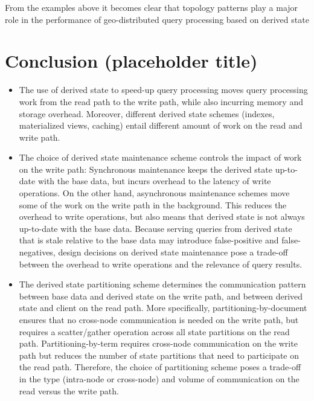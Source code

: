 \bigskip

From the examples above it becomes clear that topology patterns play a major role in the performance of geo-distributed
query processing based on derived state

\section{Conclusion (placeholder title)}


\begin{itemize}
  \item The use of derived state to speed-up query processing moves query processing work from the read path to the write
  path, while also incurring memory and storage overhead.
  Moreover, different derived state schemes (indexes, materialized views, caching) entail different amount of work
  on the read and write path.

  \item The choice of derived state maintenance scheme controls the impact of work on the write path:
  Synchronous maintenance keeps the derived state up-to-date with the base data,
  but incurs overhead to the latency of write operations.
  On the other hand, asynchronous maintenance schemes move some of the work on the write path in the background.
  This reduces the overhead to write operations, but also means that derived state is not always up-to-date with the base
  data.
  Because serving queries from derived state that is stale relative to the base data may introduce false-positive and
  false-negatives,
  design decisions on derived state maintenance pose a trade-off between the overhead to write operations
  and the relevance of query results.

  \item The derived state partitioning scheme determines the communication pattern between base data and derived state
  on the write path, and between derived state and client on the read path.
  More specifically, partitioning-by-document ensures that no cross-node communication is needed on the write path,
  but requires a scatter/gather operation across all state partitions on the read path.
  Partitioning-by-term requires cross-node communication on the write path but reduces the number of state partitions
  that need to participate on the read path.
  Therefore, the choice of partitioning scheme poses a trade-off in the type (intra-node or cross-node) and volume
  of communication on the read versus the write path.


\end{itemize}
